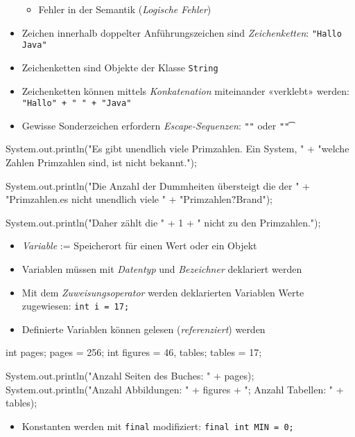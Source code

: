 \documentclass[a4paper,10pt, dvipsnames]{report}
\begin{document}
\begin{itemize}
\begin{itemize}
        \item Fehler in der Semantik (\textit{Logische Fehler})
    \end{itemize}
	\item Zeichen innerhalb doppelter Anführungszeichen sind \textit{Zeichenketten}: \texttt{"Hallo Java"}
	\item Zeichenketten sind Objekte der Klasse \texttt{String}
	\item Zeichenketten können mittels \textit{Konkatenation} miteinander «verklebt» werden: \texttt{"Hallo" + " " + "Java"}
	\item Gewisse Sonderzeichen erfordern \textit{Escape-Sequenzen}: \texttt{"\n"} oder \texttt{"\t"}
\end{itemize}

\begin{javacodebox}
System.out.println("Es gibt unendlich viele Primzahlen. Ein System, "
        + "welche Zahlen Primzahlen sind, ist nicht bekannt.");

System.out.println("\"Die Anzahl der Dummheiten übersteigt die der "
        + "Primzahlen.\nGibt es nicht unendlich viele "
        + "Primzahlen?\"\n\tGregor Brand");

System.out.println("Daher zählt die " + 1 + " nicht zu den Primzahlen.");
\end{javacodebox}

\begin{itemize}
	\item \textit{Variable} := Speicherort für einen Wert oder ein Objekt
	\item Variablen müssen mit \textit{Datentyp} und \textit{Bezeichner} deklariert werden
	\item Mit dem \textit{Zuweisungsoperator} werden deklarierten Variablen Werte zugewiesen: \texttt{int i = 17;}
	\item Definierte Variablen können gelesen (\textit{referenziert}) werden
\end{itemize}

\begin{javacodebox}
int pages;
pages = 256;
int figures = 46, tables;
tables = 17;

System.out.println("Anzahl Seiten des Buches: " + pages);
System.out.println("Anzahl Abbildungen: " + figures
+ "; Anzahl Tabellen: " + tables);
\end{javacodebox}

\begin{itemize}
	\item Konstanten werden mit \texttt{final} modifiziert: \texttt{final int MIN = 0;}
\end{itemize}
\end{document}
